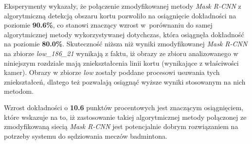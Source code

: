 Eksperymenty wykazały, że połączenie zmodyfikowanej metody \textit{Mask R-CNN} z algorytmiczną detekcją obszaru kortu pozwoliło na osiągnięcie dokładności na poziomie \textbf{90.6\%}, co stanowi znaczący wzrost w~porównaniu do samej algorytmicznej metody wykorzystywanej dotychczas, która osiągnęła dokładność na poziomie \textbf{80.0\%}.
Skuteczność niższa niż wyniki zmodyfikowanej \textit{Mask R-CNN} na zbiorze \textit{low\_186\_21} wynikają z faktu, iż obrazy ze zbioru analizowanego w niniejszym rozdziale mają zniekształcenia linii kortu (wynikające z właściwości kamer). Obrazy w zbiorze \textit{low} zostały poddane procesowi usuwania tych zniekształceń, dlatego też pozwalają osiągnąć wyższe wyniki stosowanym na nich metodom.

Wzrost dokładności o \textbf{10.6} punktów procentowych jest znaczącym osiągnięciem, które wskazuje na to, iż zastosowanie takiej algorytmicznej metody połączonej ze zmodyfikowaną siecią \textit{Mask R-CNN} jest potencjalnie dobrym rozwiązaniem na potrzeby systemu do sędziowania meczów badmintona.
